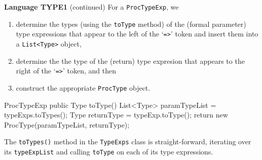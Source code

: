 \begin{minipage}[t]{\sw}
\slidenumber
\LARGE
{\bf Language TYPE1} (continued)\exx
For a \verb'ProcTypeExp', we\
\begin{enumerate}
\item determine the types (using the \verb'toType' method)
of the (formal parameter) type expressions
that appear to the left of the `\verb'=>'' token
and insert them into a \verb'List<Type>' object,
\item determine the the type of the (return) type expresion that appears
to the right of the `\verb'=>'' token, and then
\item
construct the appropriate \verb'ProcType' object.
\end{enumerate}
{\Large
\begin{qv}
ProcTypeExp
    public Type toType() {
        List<Type> paramTypeList = typeExps.toTypes();
        Type returnType = typeExp.toType();
        return new ProcType(paramTypeList, returnType);
    }
\end{qv}
}
The \verb'toTypes()' method in the \verb'TypeExps' class
is straight-forward,
iterating over its \verb'typeExpList'
and calling \verb'toType' on each of its type expressions.
\end{minipage}
